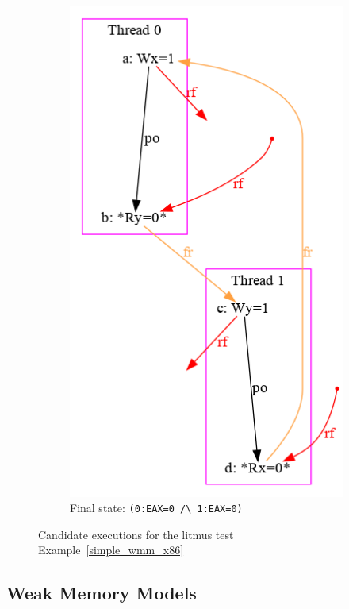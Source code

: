 \begin{figure}
\begin{subfigure}[t]{.23\textwidth}
  \includegraphics[width=.9\linewidth]{img/my/sb-example/SB-dot-4.png}
  \caption{Final state: \texttt{(0:EAX=0~/\textbackslash~1:EAX=0)}}
  \label{simple_wmm_x86_pic:sub4}
\end{subfigure}
\hfill
\caption{Candidate executions for the litmus test Example~\ref{simple_wmm_x86}}
\label{simple_wmm_x86_pic}
\end{figure}


\subsection{Weak Memory Models}
\label{ch:wmm:wmm}

